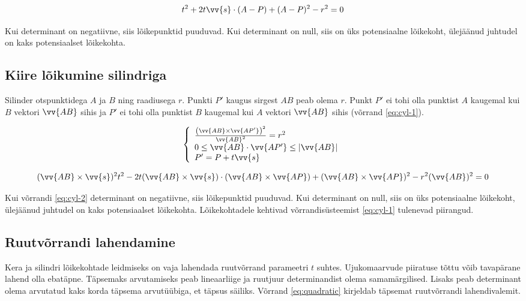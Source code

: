\documentclass[a4paper,12pt]{report}
\renewcommand{\vec}[1]{\vv{#1}}
\begin{document}
\begin{equation} \label{eq:sphere2}
t^2 + 2 t \vec s \cdot (A-P) + (A-P)^2 - r^2 = 0
\end{equation}

Kui determinant on negatiivne, siis lõikepunktid puuduvad. Kui determinant
on null, siis on üks potensiaalne lõikekoht, ülejäänud juhtudel on kaks
potensiaalset lõikekohta.

\subsection{Kiire lõikumine silindriga}
Silinder otspunktidega \(A\) ja \(B\) ning raadiusega \(r\). Punkti \(P'\) kaugus sirgest \(AB\)
peab olema \(r\). Punkt \(P'\) ei tohi olla punktist \(A\) kaugemal kui \(B\) vektori \(\vec{AB}\)
sihis ja \(P'\) ei tohi olla punktist \(B\) kaugemal kui \(A\) vektori \(\vec{AB}\) sihis (võrrand \ref{eq:cyl-1}).

\begin{equation} \label{eq:cyl-1}
\left\{
\begin{array}{l}
\frac{\left(\vec{AB}\times\vec{AP'}\right)^2}{\vec{AB}^2} = r^2 \\
0\leq\vec{AB}\cdot\vec{AP'}\leq|\vec{AB}| \\
P' = P + t\vec s
\end{array}
\right.
\end{equation}

\begin{equation} \label{eq:cyl-2}
(\vec{AB}\times\vec s)^2 t^2 -2t(\vec{AB}\times\vec s)\cdot(\vec{AB}\times\vec{AP}) + (\vec{AB}\times\vec{AP})^2 - r^2(\vec{AB})^2 = 0
\end{equation}

Kui võrrandi \ref{eq:cyl-2} determinant on negatiivne, siis lõikepunktid
puuduvad. Kui determinant on null, siis on üks potensiaalne lõikekoht,
ülejäänud juhtudel on kaks potensiaalset lõikekohta. Lõikekohtadele
kehtivad võrrandisüsteemist \ref{eq:cyl-1} tulenevad piirangud.

\subsection{Ruutvõrrandi lahendamine}
Kera ja silindri lõikekohtade leidmiseks on vaja lahendada ruutvõrrand
parameetri \(t\) suhtes. Ujukomaarvude piiratuse tõttu võib tavapärane
lahend olla ebatäpne. Täpsemaks arvutamiseks peab lineaarliige ja ruutjuur
determinandist olema samamärgilised. Lisaks peab determinant olema arvutatud
kaks korda täpsema arvutüübiga, et täpsus säiliks. \cite{FP-quadratic}
Võrrand \ref{eq:quadratic} kirjeldab täpsemat ruutvõrrandi lahendivalemit.
\end{document}
